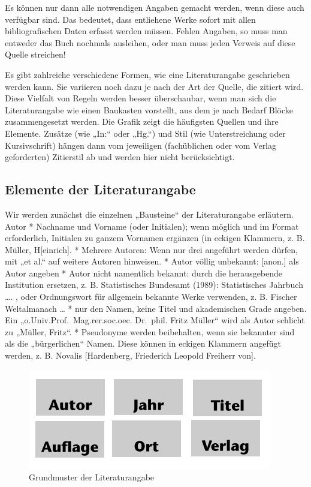 \documentclass[]{book}
\theoremstyle{definition}
\theoremstyle{definition}
\theoremstyle{definition}
\theoremstyle{remark}
\begin{document}
Es können nur dann alle notwendigen Angaben gemacht werden, wenn diese
auch verfügbar sind. Das bedeutet, dass entliehene Werke sofort mit
allen bibliografischen Daten erfasst werden müssen. Fehlen Angaben, so
muss man entweder das Buch nochmals ausleihen, oder man muss jeden
Verweis auf diese Quelle streichen!

Es gibt zahlreiche verschiedene Formen, wie eine Literaturangabe
geschrieben werden kann. Sie variieren noch dazu je nach der Art der
Quelle, die zitiert wird. Diese Vielfalt von Regeln werden besser
überschaubar, wenn man sich die Literaturangabe wie einen Baukasten
vorstellt, aus dem je nach Bedarf Blöcke zusammengesetzt werden. Die
Grafik zeigt die häufigsten Quellen und ihre Elemente. Zusätze (wie
„In:`` oder „Hg.``) und Stil (wie Unterstreichung oder Kursivschrift)
hängen dann vom jeweiligen (fachüblichen oder vom Verlag geforderten)
Zitierstil ab und werden hier nicht berücksichtigt.

\subsection{Elemente der
Literaturangabe}\label{elemente-der-literaturangabe}

Wir werden zunächst die einzelnen „Bausteine`` der Literaturangabe
erläutern. Autor * Nachname und Vorname (oder Initialen); wenn möglich
und im Format erforderlich, Initialen zu ganzem Vornamen ergänzen (in
eckigen Klammern, z. B. Müller, H{[}einrich{]}. * Mehrere Autoren: Wenn
nur drei angeführt werden dürfen, mit „et al.`` auf weitere Autoren
hinweisen. * Autor völlig unbekannt: {[}anon.{]} als Autor angeben *
Autor nicht namentlich bekannt: durch die herausgebende Institution
ersetzen, z. B. Statistisches Bundesamt (1989): Statistisches Jahrbuch
\ldots{}. , oder Ordnungswort für allgemein bekannte Werke verwenden, z.
B. Fischer Weltalmanach \ldots{} * nur den Namen, keine Titel und
akademischen Grade angeben. Ein „o.Univ.Prof.~Mag.rer.soc.oec. Dr.~phil.
Fritz Müller`` wird als Autor schlicht zu „Müller, Fritz``. * Pseudonyme
werden beibehalten, wenn sie bekannter sind als die „bürgerlichen``
Namen. Diese können in eckigen Klammern angefügt werden, z. B. Novalis
{[}Hardenberg, Friederich Leopold Freiherr von{]}.

\begin{figure}

{\centering \includegraphics{images/zitieren-buch-min} 

}

\caption{Grundmuster der Literaturangabe}\label{fig:unnamed-chunk-25}
\end{figure}
\end{document}
